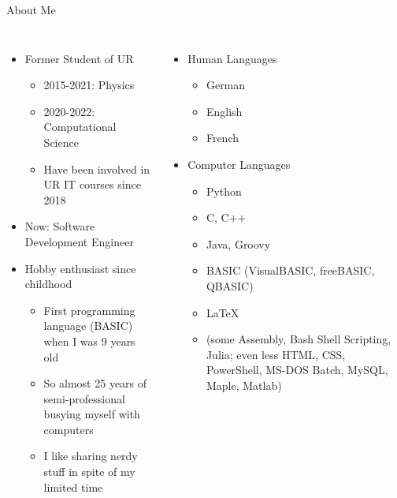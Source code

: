 
\begin{frame}[t,plain]
\titlepage
\end{frame}


\begin{frame}{About Me}
%
\begin{columns}[T]
\begin{itemize}
\item Former Student of UR
	\begin{itemize}
	\item 2015-2021: Physics
	\item 2020-2022: Computational Science
	\item Have been involved in UR IT courses since 2018
	\end{itemize}
\item Now: Software Development Engineer
\item Hobby enthusiast since childhood
	\begin{itemize}
	\item First programming language (BASIC) when I was 9 years old
	\item So almost 25 years of semi-professional busying myself with computers
	\item I like sharing nerdy stuff in spite of my limited time
	\end{itemize}
\end{itemize}
%
\begin{itemize}
\item Human Languages
	\begin{itemize}
	\item German
	\item English
	\item French
	\end{itemize}
\item Computer Languages
	\begin{itemize}
	\item Python
	\item C, C++
	\item Java, Groovy
	\item BASIC (VisualBASIC, freeBASIC, QBASIC)
	\item \LaTeX
	\item (some Assembly, Bash Shell Scripting, Julia; even less HTML, CSS, PowerShell, MS-DOS Batch, MySQL, Maple, Matlab)
	\end{itemize}
\end{itemize}
\end{columns}
%
\end{frame}

